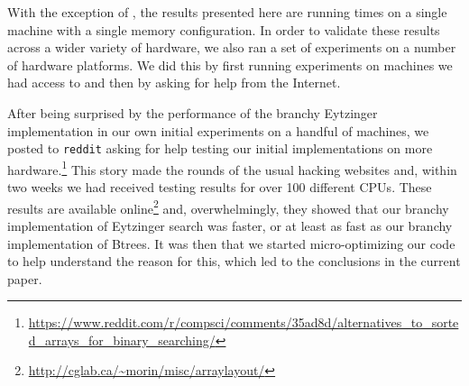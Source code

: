 \documentclass{patmorin}
\begin{document}
With the exception of , the results presented here are
running times on a single machine with a single memory configuration.
In order to validate these results across a wider variety of hardware,
we also ran a set of experiments on a number of hardware platforms. We
did this by first running experiments on machines we had access to and
then by asking for help from the Internet.

After being surprised by the performance of the branchy
Eytzinger implementation in our own initial experiments
on a handful of machines, we posted to \texttt{reddit}
asking for help testing our initial implementations on more 
hardware.\footnote{\url{https://www.reddit.com/r/compsci/comments/35ad8d/alternatives_to_sorted_arrays_for_binary_searching/}}
This story made the rounds of the usual hacking websites
and, within two weeks we had received testing results
for over 100 different CPUs.  These results are available
online\footnote{\url{http://cglab.ca/~morin/misc/arraylayout/}} and,
overwhelmingly, they showed that our branchy implementation of Eytzinger
search was faster, or at least as fast as our branchy implementation
of Btrees.  It was then that we started micro-optimizing our code to
help understand the reason for this, which led to the conclusions in
the current paper.
\end{document}
